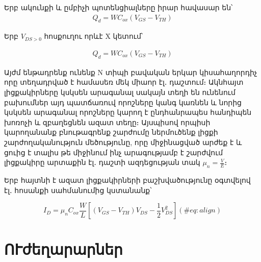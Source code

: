 \documentclass[
]{book}
\begin{document}
\begin{blackbox}

\begin{lf}

\begin{center}
Երբ ակունքի և ըմբիչի պոտենցիալները իրար հավասար են՝ \begin{align}  
  Q_d = WC_{ox}(V_{GS} - V_{TH})
\end{align}

\end{center}

\end{lf}

\begin{rig}

\begin{center}
Երբ \(V_{DS>0}\) հոսքուղու որևէ X կետում՝

\begin{align} 
  Q_d = WC_{ox}(V_{GS} - V_{TH})
\end{align}

\end{center}

\end{rig}

\end{blackbox}

Այժմ ենթադրենք ունենք N տիպի բավական երկար կիսահաղորդիչ որը տեղադրված է
համասեռ մեկ միաոր էլ․ դաշտում։ Ակնհայտ լիցքակիրները կսկսեն արագանալ
սակայն տեղի են ունենում բախումներ այդ պատճառուվ որոշները կանգ կառնեն և
նորից կսկսեն արագանալ որոշները կարող է ընդհանրապես հանդիպեն խոռոչի և
զբաղեցնեն ազատ տեղը։ Այսպիսով որպիսի կարողանանք բնութագրենք շարժումը
ներմուծենք լիցքի շարժողականություն մեծությունը, որը միջինացված արժեք է և
ցուից է տալիս թե միջինում ինչ արագությամբ է շարժվում լիցքակիրը արտաքին
էլ․ դաշտի ազդեցության տակ \(μ_n = \frac{V}{E}\)։

Երբ հայտնի է ազատ լիցքակիրների բաշխվածությունը օգտվելով էլ․ հոսանքի
սահմանումից կստանանք՝

\begin{equation} 
  I_{D} = μ_n C_{ox} \frac{W}{L}[(V_{GS} - V_{TH})V_{DS} - \frac{1}{2}V_{DS}^2]
  (\#eq:align)
\end{equation}

\hypertarget{ux578ux582ux56aux565ux572ux561ux580ux561ux580ux576ux565ux580}{%
\chapter{ՈՒժեղարարներ}\label{ux578ux582ux56aux565ux572ux561ux580ux561ux580ux576ux565ux580}}
\end{document}
